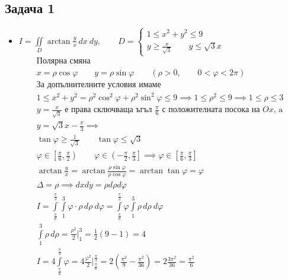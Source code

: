 \documentclass[a4paper,fleqn,12pt]{article}
\theoremstyle{definition}
\begin{document}
\subsection*{Задача 1}
\begin{itemize}
\item $I = \iint\limits_D \arctan \frac{y}{x} \, dx \ dy, \qquad 
D = \begin{cases} 1 \leq x^2 + y^2 \leq 9 \\ y \geq \frac{x}{\sqrt{3}} \qquad y \leq \sqrt{3}x \end{cases} $
\begin{gather*}
\text{Полярна смяна} \\
x = \rho \cos \varphi \qquad y = \rho \sin \varphi \qquad (\rho > 0, \qquad 0< \varphi < 2\pi ) \\
\text{За допълнителните условия имаме} \\
1 \leq x^2 + y^2  = \rho^2 \cos^2 \varphi +\rho^2 \sin^2 \varphi \leq 9 
\implies  1 \leq \rho^2 \leq 9 \implies
 1 \leq \rho \leq 3 \\
y = \frac{x}{\sqrt{3}} \text{ е права сключваща ъгъл $\frac{\pi}{6}$ с положителната посока на $Ox$, a }\\
y = \sqrt{3}x - \frac{\pi}{3} \implies \\
\tan \varphi \geq \frac{1}{\sqrt{3}} \qquad \tan \varphi \leq \sqrt{3} \\
\varphi \in \left[\frac{\pi}{6} , \frac{\pi}{2}\right) \qquad \varphi \in \left(- \frac{\pi}{2} ,\frac{\pi}{3}\right] \implies
\varphi \in \left[\frac{\pi}{6}, \frac{\pi}{3} \right] \\
\arctan \frac{y}{x} =  
\arctan \frac{\rho \sin \varphi}{\rho \cos \varphi} = 
\arctan \tan \varphi = \varphi \\
\Delta = \rho \implies dxdy = \rho d\rho d\varphi\\
I = \int\limits_{\frac{\pi}{6}} ^{\frac{\pi}{3}} \int\limits_1 ^3 \varphi \cdot \rho \, d\rho \ d\varphi = \int\limits_{\frac{\pi}{6}} ^{\frac{\pi}{3}} \varphi \int\limits_1 ^3 \rho \, d\rho \ d\varphi \\
\int\limits_1 ^3 \rho \, d\rho = \frac{\rho^2}{2} \Big|_1 ^3 = \frac{1}{2} (9-1) = 4 \\
I = 4 \int\limits_{\frac{\pi}{6}} ^{\frac{\pi}{3}} \varphi = 
4\frac{\varphi^2}{2} \Big|_{\frac{\pi}{6}} ^{\frac{\pi}{3}} = 
2 \left(\frac{\pi^2}{9} - \frac{\pi^2}{36}\right) = 2\frac{3\pi^2}{36} = \frac{\pi^2}{6}
\end{gather*}


\end{itemize}
\end{document}
